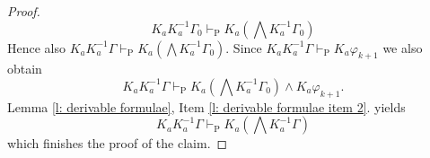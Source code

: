 \documentclass{myifcolog}
\newcommand{\K}{K}
\newcommand{\agi}{a}
\numberwithin{theorem}{section}
\begin{document}
\begin{proof}
    \begin{equation*}
        \K_\agi \K_\agi^{-1} \Gamma_0 \vdash_\mathrm{P} \K_\agi (\bigwedge \K_\agi^{-1} \Gamma_0)
    \end{equation*}
    Hence also $\K_\agi \K_\agi^{-1} \Gamma \vdash_\mathrm{P} \K_\agi (\bigwedge \K_\agi^{-1} \Gamma_0)$. Since $\K_\agi \K_\agi^{-1} \Gamma \vdash_\mathrm{P} \K_\agi \varphi_{k+1}$ we also obtain
    \begin{equation*}
        \K_\agi \K_\agi^{-1} \Gamma \vdash_\mathrm{P} \K_\agi (\bigwedge \K_\agi^{-1} \Gamma_0) \wedge \K_\agi \varphi_{k+1}.
    \end{equation*}
     Lemma \ref{l: derivable formulae}, Item \ref{l: derivable formulae item 2}. yields
     \begin{equation*}
         \K_\agi \K_\agi^{-1} \Gamma \vdash_\mathrm{P} \K_\agi (\bigwedge \K_\agi^{-1} \Gamma)
     \end{equation*}
     which finishes the proof of the claim. \smallskip


\end{proof}
\end{document}
